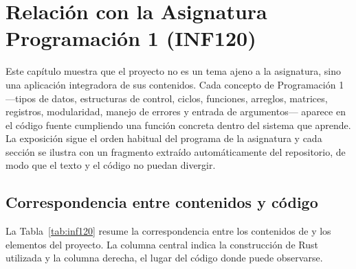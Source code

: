 \chapter{Relación con la Asignatura Programación 1 (INF120)}\label{cap:inf120}
Este capítulo muestra que el proyecto no es un tema ajeno a la asignatura, sino una aplicación integradora de sus contenidos. Cada concepto de Programación 1 ---tipos de datos, estructuras de control, ciclos, funciones, arreglos, matrices, registros, modularidad, manejo de errores y entrada de argumentos--- aparece en el código fuente cumpliendo una función concreta dentro del sistema que aprende. La exposición sigue el orden habitual del programa de la asignatura y cada sección se ilustra con un fragmento extraído automáticamente del repositorio, de modo que el texto y el código no puedan divergir.

\section{Correspondencia entre contenidos y código}
La Tabla~\ref{tab:inf120} resume la correspondencia entre los contenidos de \Sigla{} y los elementos del proyecto. La columna central indica la construcción de Rust utilizada y la columna derecha, el lugar del código donde puede observarse.

